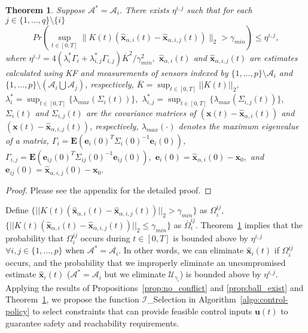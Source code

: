 \documentclass[journal]{IEEEtran}
\newtheorem{Theorem}{Theorem}
\begin{document}
\begin{Theorem}
\label{theorem:stability_guarantee_EFK_attack_free}
Suppose $\mathcal{A}^{\ast} = \mathcal{A}_i$. There exists $\eta^{i,j}$ such that for each $j \in \{1,\ldots,q\} \setminus \{i\}$ $$Pr(\sup_{t \in [0,T]} \| K(t)\left(\mathbf{\hat{x}}_{\alpha,i}(t) - \mathbf{\hat{x}}_{\alpha,i,j}(t)\right) \|_2 > \gamma_{min} ) \leq \eta^{i,j},$$ where $\eta^{i,j} = {4(\lambda_i^{\ast}\Gamma_i + \lambda_{i,j}^{\ast}\Gamma_{i,j})\overline{K}^{2}}/{\gamma_{min}^{2}},$ $\mathbf{\hat{x}}_{\alpha,i}(t)$ and $\mathbf{\hat{x}}_{\alpha,i,j}(t)$ are estimates calculated using KF and measurements of sensors indexed by $\{1,\ldots,p\} \setminus \mathcal{A}_i$ and $\{1,\ldots,p\} \setminus (\mathcal{A}_i \bigcup \mathcal{A}_j)$, respectively, $\overline{K} = \sup_{t \in [0,T]} ||K(t)||_2,$ $\lambda_i^{\ast} = \sup_{t \in [0,T]}{\{\lambda_{max}(\Sigma_i(t))\}},$ $\lambda_{i,j}^{\ast} = \sup_{t \in [0,T]}{\{\lambda_{max}(\Sigma_{i,j}(t))\}},$ $\Sigma_i(t)$ and $\Sigma_{i,j}(t)$ are the covariance matrices of $(\mathbf{x}(t)-\hat{\mathbf{x}}_{\alpha,i}(t))$ and $(\mathbf{x}(t)-\hat{\mathbf{x}}_{\alpha,i,j}(t))$, respectively, $\lambda_{max}(\cdot)$ denotes the maximum eigenvalue of a matrix, $\Gamma_i = \mathbf{E}\left(\mathbf{e}_i(0)^T{\Sigma_i(0)}^{-1}\mathbf{e}_i(0)\right)$, $\Gamma_{i,j} = \mathbf{E}\left(\mathbf{e}_{ij}(0)^T{\Sigma_{ij}(0)}^{-1}\mathbf{e}_{ij}(0)\right),$ $\mathbf{e}_i(0) = \hat{\mathbf{x}}_{\alpha,i}(0) - \mathbf{x}_0,$ and $\mathbf{e}_{ij}(0) = \hat{\mathbf{x}}_{\alpha,i,j}(0) - \mathbf{x}_0.$
\end{Theorem}
\begin{proof}
Please see the appendix for the detailed proof.
\end{proof}

Define $\{||K(t)\left(\mathbf{\hat{x}}_{\alpha,i}(t) - \mathbf{\hat{x}}_{\alpha,i,j}(t)\right) ||_2 > \gamma_{min}\}$ as $\Omega^{ij}_{i},$ $\{||K(t)\left(\mathbf{\hat{x}}_{\alpha,i}(t) - \mathbf{\hat{x}}_{\alpha,i,j}(t)\right) ||_2 \leq \gamma_{min}\}$ as $\overline{\Omega}^{ij}_{i}.$ Theorem~\ref{theorem:stability_guarantee_EFK_attack_free} implies that the probability that $\Omega^{ij}_{i}$ occurs during $t \in [0, T]$ is bounded above by $\eta^{i,j}$ $\forall i,j \in \{1,\ldots,p\}$ when $\mathcal{A}^{\ast} = \mathcal{A}_i$. In other words, we can eliminate $\hat{\mathbf{x}}_i(t)$ if $\Omega_i^{ij}$ occurs, and the probability that we improperly eliminate an uncompromised estimate $\hat{\mathbf{x}}_i(t)$ ($\mathcal{A}^{\ast} = \mathcal{A}_i$ but we eliminate $\mathcal{U}_{\gamma_i}$) is bounded above by $\eta^{i,j}.$ Applying the results of Propositions~\ref{prop:no_conflict} and \ref{prop:ball_exist} and Theorem~\ref{theorem:stability_guarantee_EFK_attack_free}, we propose the function $\mathcal{I}$\_Selection in Algorithm~\ref{algo:control-policy} to select constraints that can provide feasible control inputs $\mathbf{u}(t)$ to guarantee safety and reachability requirements.
\end{document}
